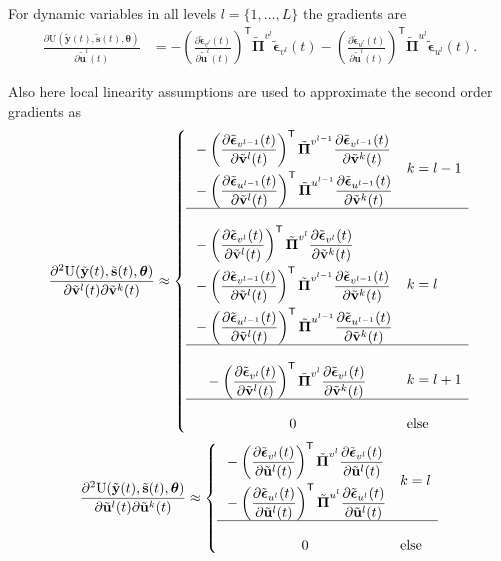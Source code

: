 \documentclass[a4paper,10pt]{article}
\newcommand{\bs}[1]{\mathbf{#1}}					%
\newcommand{\bgs}[1]{\boldsymbol{#1}}				%
\newcommand{\pd}[2]{\frac{\partial #1}{\partial #2}} 	%
\newcommand{\ppd}[3]{\frac{\partial^2 #1}{\partial #2 \partial #3}} %
\newcommand{\tr}{\mathsf{T}}				%
\newcommand{\eq}[1]{\begin{equation} #1 \end{equation}}%
\newcommand{\gc}[1]{\tilde{#1}} %
\renewcommand{\ss}{u}         %
\newcommand{\sv}{v}         %
\newcommand{\so}{y}         %
\newcommand{\st}{s}         %
\newcommand{\spe}{\epsilon} %
\renewcommand{\sp}{\theta}    %
\newcommand{\ps}{\bs{\ss}}    %
\newcommand{\pv}{\bs{\sv}}    %
\newcommand{\po}{\bs{\so}}    %
\newcommand{\pt}{\bs{\st}}     %
\newcommand{\ppe}{\bgs{\spe}} %
\newcommand{\psg}{\gc{\ps}}    %
\newcommand{\pvg}{\gc{\pv}}    %
\newcommand{\ptg}{\gc{\pt}}     %
\newcommand{\pog}{\gc{\po}}    %
\newcommand{\ppeg}{\gc{\ppe}} %
\newcommand{\pp}{\bgs{\sp}} %
\newcommand{\U}{\mathrm{U}}			%
\begin{document}
For dynamic variables in all levels $l=\{1,\dots,L\}$ the gradients are
\begin{align}
    \pd{\U(\pog(t),\ptg(t),\pp)}{\psg^l(t)} &=  - \left(\pd{\ppeg_{\sv^{l}}(t)}{\psg^l(t)}\right)^\tr\gc{\bgs{\Pi}}^{\sv^{l}}\ppeg_{\sv^{l}}(t) - \left(\pd{\ppeg_{\ss^{l}}(t)}{\psg^l(t)}\right)^\tr\gc{\bgs{\Pi}}^{\ss^{l}}\ppeg_{\ss^{l}}(t).
\end{align}

Also here local linearity assumptions are used to approximate the second order gradients as
\eq{\label{eq:grad2IntActDvv}
    \ppd{\U(\pog(t),\ptg(t),\pp)}{\pvg^l(t)}{\pvg^k(t)} \approx  \left\{\begin{array}{cl} 
        \begin{split}&- \left(\pd{\ppeg_{\sv^{l-1}}(t)}{\pvg^l(t)}\right)^\tr\gc{\bgs{\Pi}}^{\sv^{l-1}}\pd{\ppeg_{\sv^{l-1}}(t)}{\pvg^k(t)}\\
    &- \left(\pd{\ppeg_{\ss^{l-1}}(t)}{\pvg^l(t)}\right)^\tr\gc{\bgs{\Pi}}^{\ss^{l-1}}\pd{\ppeg_{\ss^{l-1}}(t)}{\pvg^k(t)}\end{split}& k = l-1\\
        \hline\\
        \begin{split} &- \left(\pd{\ppeg_{\sv^{l}}(t)}{\pvg^l(t)}\right)^\tr\gc{\bgs{\Pi}}^{\sv^{l}}\pd{\ppeg_{\sv^{l}}(t)}{\pvg^k(t)}\\
        &- \left(\pd{\ppeg_{\sv^{l-1}}(t)}{\pvg^l(t)}\right)^\tr\gc{\bgs{\Pi}}^{\sv^{l-1}}\pd{\ppeg_{\sv^{l-1}}(t)}{\pvg^k(t)}\\
    &- \left(\pd{\ppeg_{\ss^{l-1}}(t)}{\pvg^l(t)}\right)^\tr\gc{\bgs{\Pi}}^{\ss^{l-1}}\pd{\ppeg_{\ss^{l-1}}(t)}{\pvg^k(t)}\end{split} & k=l\\
        \hline\\
        \begin{split}&- \left(\pd{\ppeg_{\sv^{l}}(t)}{\pvg^l(t)}\right)^\tr\gc{\bgs{\Pi}}^{\sv^{l}}\pd{\ppeg_{\sv^{l}}(t)}{\pvg^k(t)}\end{split}& k = l+1\\
        \hline\\
        0 & \mathrm{else}
    \end{array}\right.
}
\eq{
    \ppd{\U(\pog(t),\ptg(t),\pp)}{\psg^l(t)}{\psg^k(t)} \approx  \left\{\begin{array}{cl}
         \begin{split}&- \left(\pd{\ppeg_{\sv^{l}}(t)}{\psg^l(t)}\right)^\tr\gc{\bgs{\Pi}}^{\sv^{l}}\pd{\ppeg_{\sv^{l}}(t)}{\psg^l(t)}\\ 
        &- \left(\pd{\ppeg_{\ss^{l}}(t)}{\psg^l(t)}\right)^\tr\gc{\bgs{\Pi}}^{\ss^{l}}\pd{\ppeg_{\ss^{l}}(t)}{\psg^l(t)}\end{split} & k=l\\
        \hline\\
        0 & \mathrm{else}\end{array} \right.
}
\end{document}
